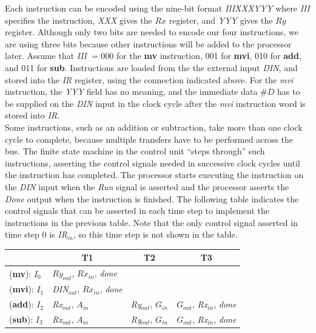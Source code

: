Each instruction can be encoded using the nine-bit format \textit{IIIXXXYYY} where \textit{III} specifies the instruction, \textit{XXX} gives the $Rx$ register, and \textit{YYY} gives the $Ry$ register. Although only two bits are needed to encode our four instructions, we are using three bits because other instructions will be added to the processor later. Assume that \textit{III} $=000$ for the \textbf{mv} instruction, 001 for \textbf{mvi}, 010 for \textbf{add}, and 011 for \textbf{sub}. Instructions are loaded from the the external input \textit{DIN}, and stored into the \textit{IR} register, using the connection indicated above. For the \textit{mvi} instruction, the \textit{YYY} field has no meaning, and the immediate data \#$D$ has to be supplied on the \textit{DIN} input in the clock cycle after the \textit{mvi} instruction word is stored into \textit{IR}.\bigskip\\
Some instructions, such as an addition or subtraction, take more than one clock cycle to complete, because multiple transfers have to be performed across the bus. The finite state machine in the control unit “steps through” such instructions, asserting the control signals needed in successive clock cycles until the instruction has completed. The processor starts executing the instruction on the \textit{DIN} input when the \textit{Run} signal is asserted and the processor asserts the \textit{Done} output when the instruction is finished. The following table indicates the control signals that can be asserted in each time step to implement the instructions in the previous table. Note that the only control signal asserted in time step 0 is \textit{IR}$_{in}$, so this time step is not shown in the table.\\
\begin{table}[h]
    \begin{tabular}{l|l|l|l}
     &\multicolumn{1}{c|}{T1}&\multicolumn{1}{c|}{T2}&\multicolumn{1}{c}{T3} \\ \hline
     (\textbf{mv}): $I_0$&$Ry_{out}$, $Rx_{in}$, \textit{done}&  &  \\ \hline
     (\textbf{mvi}): $I_1$&\textit{DIN}$_{out}$, $Rx_{in}$, \textit{done}&  &  \\ \hline
     (\textbf{add}): $I_2$&\textit{Rx}$_{out}$, $A_{in}$&\textit{Ry}$_{out}$, $G_{in}$&$G_{out}$, \textit{Rx}$_{in}$, \textit{done}\\ \hline
     (\textbf{sub}): $I_3$&\textit{Rx}$_{out}$, $A_{in}$&\textit{Ry}$_{out}$, $G_{in}$&$G_{out}$, \textit{Rx}$_{in}$, \textit{done} 
    \end{tabular}
    \centering
\end{table}
\newpage

